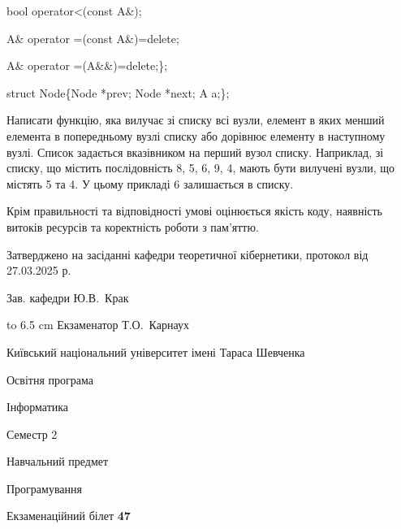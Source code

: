 \documentclass[12pt, ukrainian]{article}
\begin{document}
{\quad  bool operator<(const A\&); 

\quad A\& operator =(const A\&)=delete; 

\quad  A\& operator =(A\&\&)=delete;\};

struct Node\{Node *prev; Node *next; A a;\};

Написати функцію, яка вилучає зі списку всі вузли, елемент в яких менший елемента в попередньому вузлі списку або дорівнює елементу в наступному вузлі. Список задається вказівником на перший вузол списку. Наприклад, зі списку, що містить послідовність 8, 5, 6, 9, 4, мають бути вилучені вузли, що містять 5 та 4. У цьому прикладі 6 залишається в списку.

Крім правильності та відповідності умові оцінюється якість коду, наявність витоків ресурсів та коректність роботи з пам'яттю. 

}
{\smallskip\smallskip \begin {scriptsize} Затверджено на засіданні кафедри теоретичної кібернетики, протокол   від   27.03.2025 р.\par\smallskip\smallskip\smallskip\smallskip
{\parbox {6.5 cm} {Зав. кафедри \dotfill Ю.В.~Крак}}\hspace {0.7cm} {\hbox to 6.5 cm { Екзаменатор \dotfill Т.О.~Карнаух}} \end{scriptsize}}
\newpage
{{\begin {scriptsize}\par
{ \center  Київський національний університет імені Тараса Шевченка \par}
{\parbox {5 cm}{Освітня програма \hfill}{\parbox {7 cm}{Інформатика\hfill}}\parbox {6 cm}{\hfill Семестр 2}}\par
{\parbox {5 cm} {Навчальний предмет \hfill}\parbox {7 cm}{Програмування \hfill}\parbox {6cm}{\hfill}\par}\vspace{-15pt} \end{scriptsize}}{\center Екзаменаційний білет \No \textbf { 47 }\par}}
\end{document}
